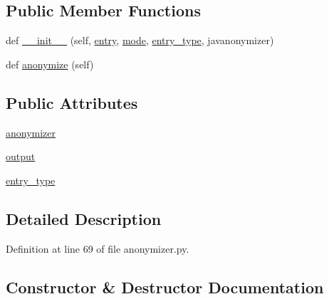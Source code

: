 \subsection*{Public Member Functions}
\begin{DoxyCompactItemize}
\item 
def \hyperlink{classparlai_1_1utils_1_1anonymizer_1_1MemoriesAnonymizer_a47fd1757c0382cd65aea78543aabb247}{\+\_\+\+\_\+init\+\_\+\+\_\+} (self, \hyperlink{classparlai_1_1utils_1_1anonymizer_1_1Anonymizer_a348d1fd062fa3f57ad81cce32e8dd2c7}{entry}, \hyperlink{classparlai_1_1utils_1_1anonymizer_1_1Anonymizer_a535b959cd821885d5af2831644cde735}{mode}, \hyperlink{classparlai_1_1utils_1_1anonymizer_1_1MemoriesAnonymizer_ace27f68e5f31c8b07a62a8dc781bca59}{entry\+\_\+type}, javanonymizer)
\item 
def \hyperlink{classparlai_1_1utils_1_1anonymizer_1_1MemoriesAnonymizer_ac22260ce2e76207a6b72122c7fb0ba00}{anonymize} (self)
\end{DoxyCompactItemize}
\subsection*{Public Attributes}
\begin{DoxyCompactItemize}
\item 
\hyperlink{classparlai_1_1utils_1_1anonymizer_1_1MemoriesAnonymizer_ab8ae572f757ec11ee806e95c707ac1ea}{anonymizer}
\item 
\hyperlink{classparlai_1_1utils_1_1anonymizer_1_1MemoriesAnonymizer_abfbdf36b25476c6aa1a90e4faf43e6f3}{output}
\item 
\hyperlink{classparlai_1_1utils_1_1anonymizer_1_1MemoriesAnonymizer_ace27f68e5f31c8b07a62a8dc781bca59}{entry\+\_\+type}
\end{DoxyCompactItemize}


\subsection{Detailed Description}


Definition at line 69 of file anonymizer.\+py.



\subsection{Constructor \& Destructor Documentation}
\mbox{\label{classparlai_1_1utils_1_1anonymizer_1_1MemoriesAnonymizer_a47fd1757c0382cd65aea78543aabb247}} 
